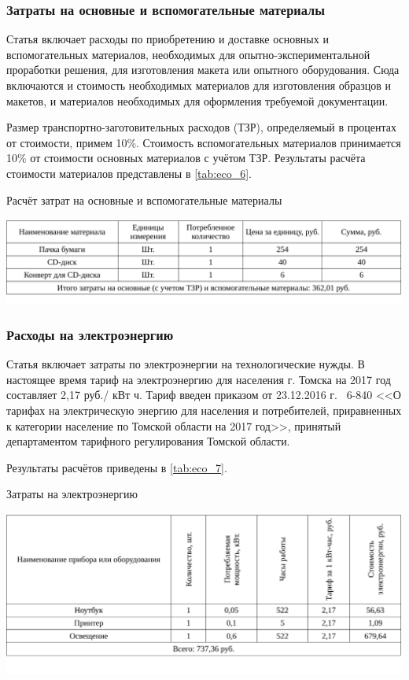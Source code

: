 \subsubsection{Затраты на основные и вспомогательные материалы}

Статья включает расходы по приобретению и доставке основных и вспомогательных материалов, необходимых для опытно-экспериментальной проработки решения, для изготовления макета или опытного оборудования. Сюда включаются и стоимость необходимых материалов для изготовления образцов и макетов, и материалов необходимых для оформления требуемой документации.

Размер транспортно-заготовительных расходов (ТЗР), определяемый в процентах от стоимости, примем 10\%. Стоимость вспомогательных материалов принимается 10\% от стоимости основных материалов с учётом ТЗР. Результаты расчёта стоимости материалов представлены в \ref{tab:eco_6}.

\begin{table}[!ht]
\caption{Расчёт затрат на основные и вспомогательные материалы}
\centering
\includegraphics[page=1, width=1\linewidth]{econom.pdf}
\label{tab:eco_6}
\end{table}


\subsubsection{Расходы на электроэнергию}

Статья включает затраты по электроэнергии на технологические нужды. В настоящее время тариф на электроэнергию для населения г. Томска на 2017 год составляет 2,17 руб./ кВт ч. Тариф введен 
приказом от 23.12.2016 г. \textnumero~6-840 <<О тарифах на электрическую энергию для населения и 
потребителей, приравненных к категории население по Томской области на 2017 год>>, 
принятый департаментом тарифного регулирования Томской области.

Результаты расчётов приведены в \ref{tab:eco_7}.

\begin{table}[!ht]
\caption{Затраты на электроэнергию}
\centering
\includegraphics[page=1, width=1\linewidth]{econom_2.pdf}
\label{tab:eco_7}
\end{table}

